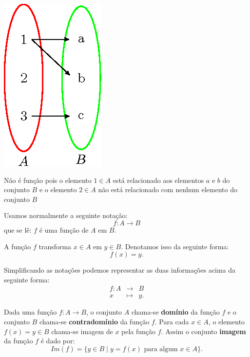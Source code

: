 \begin{multicols}{2}
\includegraphics{cap_funcao/figs/tikz/figura_cap_funcao_6}

Não é função pois o elemento $1 \in A$ está relacionado aos elementos $a$ e $b$ do conjunto $B$ e o elemento $2 \in A$ não está relacionado com nenhum elemento do conjunto $B$
\end{multicols}

Usamos normalmente a seguinte notação:
\begin{equation}
f: A \rightarrow B
\end{equation}
que se lê: $f$ é uma função de $A$ em $B$.

A função $f$ transforma $x \in A$ em $y \in B$. Denotamos isso da seguinte forma:
\begin{equation}
f(x) = y .
\end{equation}

Simplificando as notações podemos representar as duas informações acima da seguinte forma:
\begin{eqnarray*}
 f: A & \rightarrow & B \\
 x & \mapsto & y.
\end{eqnarray*}

Dada uma função $f: A \rightarrow B$, o conjunto $A$ chama-se \textbf{domínio} da função $f$ e o conjunto $B$ chama-se \textbf{contradomínio} da função $f$.  Para cada $x \in A$, o elemento $f(x)= y \in B$ chama-se imagem de $x$ pela função $f$. Assim o conjunto \textbf{imagem} da função $f$ é dado por:
\begin{equation}
Im(f)= \{ y \in B \mid y = f(x) \text{ para algum } x \in A\} .
\end{equation}

